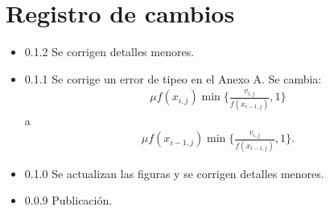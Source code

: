 \section{Registro de cambios}
\begin{itemize}
	\item{0.1.2} Se corrigen detalles menores. 
	\item{0.1.1} Se corrige un error de tipeo en el Anexo A. Se cambia:
	\begin{align*}
	\mu f(x_{i,j}) \min\{\frac{v_{i,j}}{f(x_{i-1,j})},1\}
	\end{align*}
	\noindent a
	\begin{align*}
	\mu f(x_{i-1,j}) \min\{\frac{v_{i,j}}{f(x_{i-1,j})},1\}.
	\end{align*}
	\item{0.1.0} Se actualizan las figuras y se corrigen detalles menores.
	\item{0.0.9} Publicación.
\end{itemize}